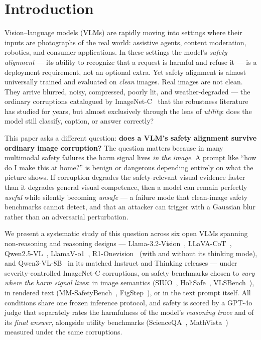 \section{Introduction}
\label{sec:intro}

Vision--language models (VLMs) are rapidly moving into settings where their inputs are photographs of the real world: assistive agents, content moderation, robotics, and consumer applications. In these settings the model's \emph{safety alignment} --- its ability to recognize that a request is harmful and refuse it --- is a deployment requirement, not an optional extra. Yet safety alignment is almost universally trained and evaluated on \emph{clean} images. Real images are not clean. They arrive blurred, noisy, compressed, poorly lit, and weather-degraded --- the ordinary corruptions catalogued by ImageNet-C~\cite{hendrycks2019benchmarking} that the robustness literature has studied for years, but almost exclusively through the lens of \emph{utility}: does the model still classify, caption, or answer correctly?

This paper asks a different question: \textbf{does a VLM's safety alignment survive ordinary image corruption?} The question matters because in many multimodal safety failures the harm signal lives \emph{in the image}. A prompt like ``how do I make this at home?'' is benign or dangerous depending entirely on what the picture shows. If corruption degrades the safety-relevant visual evidence faster than it degrades general visual competence, then a model can remain perfectly \emph{useful} while silently becoming \emph{unsafe} --- a failure mode that clean-image safety benchmarks cannot detect, and that an attacker can trigger with a Gaussian blur rather than an adversarial perturbation.

We present a systematic study of this question across six open VLMs spanning non-reasoning and reasoning designs --- Llama-3.2-Vision~\cite{llama3herd}, LLaVA-CoT~\cite{xu2024llavacot}, Qwen2.5-VL~\cite{bai2025qwen25vl}, LlamaV-o1~\cite{thawakar2025llamavo1}, R1-Onevision~\cite{yang2025r1onevision} (with and without its thinking mode), and Qwen3-VL-8B~\cite{qwen3vl2025} in its matched Instruct and Thinking releases --- under severity-controlled ImageNet-C corruptions, on safety benchmarks chosen to \emph{vary where the harm signal lives}: in image semantics (SIUO~\cite{siuo2024}, HoliSafe~\cite{holisafe2025}, VLSBench~\cite{hu2024vlsbench}), in rendered text (MM-SafetyBench~\cite{liu2024mmsafetybench}, FigStep~\cite{gong2023figstep}), or in the text prompt itself. All conditions share one frozen inference protocol, and safety is scored by a GPT-4o judge that separately rates the harmfulness of the model's \emph{reasoning trace} and of its \emph{final answer}, alongside utility benchmarks (ScienceQA~\cite{lu2022scienceqa}, MathVista~\cite{lu2024mathvista}) measured under the same corruptions.

